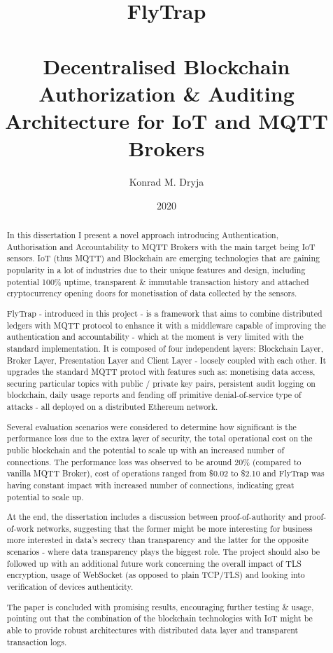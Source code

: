 \documentclass[msci]{abdnthesis}
\title{%
FlyTrap \\
\large\ \\
\huge Decentralised Blockchain Authorization \& Auditing Architecture for IoT and MQTT Brokers}
\author{Konrad M. Dryja}
\date{2020}
\begin{document}

\maketitle
\makedeclaration


\begin{abstract}
  In this dissertation I present a novel approach introducing Authentication, Authorisation and Accountability to MQTT Brokers with the main target being IoT sensors. IoT (thus MQTT) and Blockchain are emerging technologies that are gaining popularity in a lot of industries due to their unique features and design, including potential 100\% uptime, transparent \& immutable transaction history and attached cryptocurrency opening doors for monetisation of data collected by the sensors.
  
  FlyTrap - introduced in this project - is a framework that aims to combine distributed ledgers with MQTT protocol to enhance it with a middleware capable of improving the authentication and accountability - which at the moment is very limited with the standard implementation. It is composed of four independent layers: Blockchain Layer, Broker Layer, Presentation Layer and Client Layer - loosely coupled with each other. It upgrades the standard MQTT protocl with features such as: monetising data access, securing particular topics with public / private key pairs, persistent audit logging on blockchain, daily usage reports and fending off primitive denial-of-service type of attacks - all deployed on a distributed Ethereum network.
  
  Several evaluation scenarios were considered to determine how significant is the performance loss due to the extra layer of security, the total operational cost on the public blockchain and the potential to scale up with an increased number of connections. The performance loss was observed to be around 20\% (compared to vanilla MQTT Broker), cost of operations ranged from \$0.02 to \$2.10 and FlyTrap was having constant impact with increased number of connections, indicating great potential to scale up.
  
  At the end, the dissertation includes a discussion between proof-of-authority and proof-of-work networks, suggesting that the former might be more interesting for business more interested in data's secrecy than transparency and the latter for the opposite scenarios - where data transparency plays the biggest role. The project should also be followed up with an additional future work concerning the overall impact of TLS encryption, usage of WebSocket (as opposed to plain TCP/TLS) and looking into verification of devices authenticity.
  
  The paper is concluded with promising results, encouraging further testing \& usage, pointing out that the combination of the blockchain technologies with IoT might be able to provide robust architectures with distributed data layer and transparent transaction logs.
\end{abstract}
\end{document}
